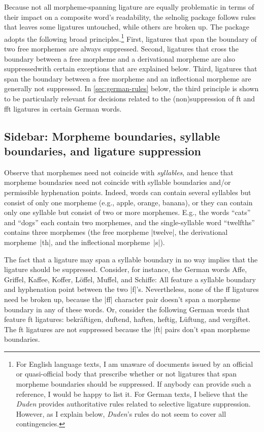 \documentclass[11pt]{article}
\newcommand{\pkg}[1]{\textsf{#1}}
\begin{document}
Because not all morpheme-spanning ligature are equally problematic in terms of their impact on a composite word's readability, the \pkg{selnolig} package follows rules that leaves some ligatures untouched, while others are broken up. The package adopts the following broad principles.\footnote{For English language texts, I am unaware of documents issued by an official or quasi-official body that prescribe whether or not ligatures that span morpheme boundaries should be suppressed. If anybody can provide such a reference, I would be happy to list it. For German texts, I believe that the \emph{Duden} provides authoritative rules related to selective ligature suppression. However, as I explain below, \emph{Duden}'s rules do not seem to cover all contingencies.} First, ligatures that span the boundary of two free morphemes are always suppressed. Second, ligatures that cross the boundary between a free morpheme and a derivational morpheme are also suppressed\textemdash with certain exceptions that are explained below. Third, ligatures that span the boundary between a free morpheme and an inflectional morpheme are generally not suppressed. In \cref{sec:german-rules} below, the third principle is shown to be particularly relevant for decisions related to the (non)suppression of ft and fft ligatures in certain German words.

\subsection{Sidebar: Morpheme boundaries, syllable boundaries, and ligature suppression}

Observe that morphemes need not coincide with \emph{syllables}, and hence that morpheme boundaries need not coincide with syllable boundaries and/or permissible hyphenation points. Indeed, words can contain several syllables but consist of only one morpheme (e.g., apple, orange, banana), or they can contain only one syllable but consist of two or more morphemes. E.g., the words \enquote{cats} and \enquote{dogs} each contain two morphemes, and the single-syllable word \enquote{twelfths} contains three morphemes (the free morpheme |twelve|, the derivational morpheme~|th|, and the inflectional morpheme~|s|). 

The fact that a ligature may span a syllable boundary in no way implies that the ligature should be suppressed. Consider, for instance, the German words Affe, Griffel, Kaffee, Koffer, Löffel, Muffel, and Schiffe: All feature a syllable boundary and hyphenation point between the two |f|'s. Nevertheless, none of the ff ligatures need be broken up, because the |ff| character pair doesn't span a morpheme boundary in any of these words. Or, consider the following German words that feature ft ligatures: bekräftigen, duftend, haften, heftig, Lüftung, and vergiftet. The ft ligatures are not suppressed because the |ft| pairs don't span morpheme boundaries.
\end{document}
